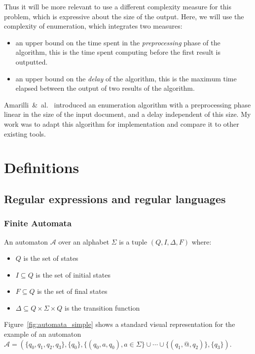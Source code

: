 \documentclass[12px]{article}
\begin{document}
    Thus it will be more relevant to use a different complexity measure for
    this problem, which is expressive about the size of the output. Here, we
    will use the complexity of enumeration, which integrates two measures:

    \begin{itemize}
      \item an upper bound on the time spent in the \textit{preprocessing}
        phase of the algorithm, this is the time spent computing before the
        first result is outputted.
      \item an upper bound on the \textit{delay} of the algorithm, this is
        the maximum time elapsed between the output of two results of the
        algorithm.
    \end{itemize}

    Amarilli~\&~al.~\cite{ICDT19} introduced an enumeration algorithm with a
    preprocessing phase linear in the size of the input document, and a delay
    independent of this size. My work was to adapt this algorithm for
    implementation and compare it to other existing tools.


  \section{Definitions}

    \subsection{Regular expressions and regular languages}

      \subsubsection{Finite Automata}

        An automaton $\mathcal{A}$ over an alphabet $\Sigma$ is a tuple $(Q, I,
        \Delta, F)$ where:
          \begin{itemize}
            \item $Q$ is the set of states
            \item $I \subseteq Q$ is the set of initial states
            \item $F \subseteq Q$ is the set of final states
            \item $\Delta \subseteq Q \times \Sigma \times Q$ is the transition
              function
          \end{itemize}
        Figure~\ref{fig:automata_simple} shows a standard visual representation
        for the example of an automaton $\mathcal{A} = (\{q_0, q_1, q_2, q_3\},
        \{q_0\}, \{(q_0, a, q_0), a \in \Sigma\} \cup \cdots \cup \{(q_1,
        \texttt{@}, q_2)\},\{q_3\})$.
\end{document}
